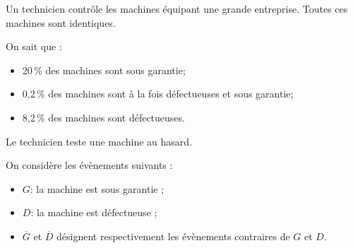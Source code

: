 
%

%
Un technicien contrôle les machines équipant une grande entreprise. Toutes ces machines sont identiques.

On sait que :

\begin{itemize}
\item[$\bullet~~$]20\,\% des machines sont sous garantie;
\item[$\bullet~~$]0,2\,\% des machines sont à la fois défectueuses et sous garantie;
\item[$\bullet~~$]8,2\,\% des machines sont défectueuses.
\end{itemize}

\smallskip

Le technicien teste une machine au hasard.


On considère les évènements suivants :
\begin{itemize}
\item[$\bullet~~$]$G$: \og la machine est sous garantie \fg{} ;
\item[$\bullet~~$]$D$: \og la machine est défectueuse\fg{} ;
\item[$\bullet~~$]$\overline{G}$ et $\overline{D}$ désignent respectivement les évènements contraires de $G$ et $D$.
\end{itemize}
%
%
%

